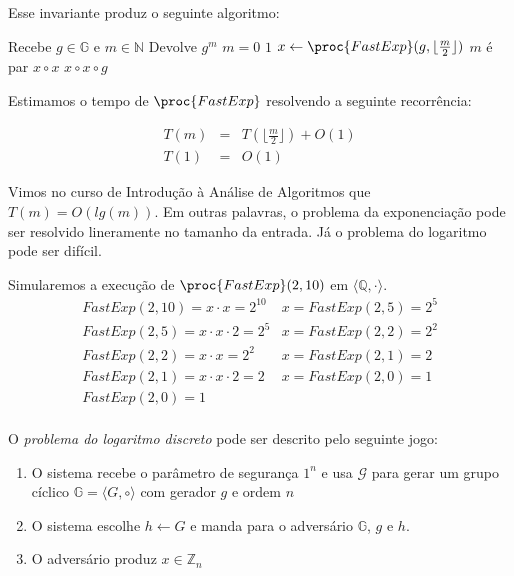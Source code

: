 Esse invariante produz o seguinte algoritmo:
\begin{codebox}
\li \Comment Recebe $g \in \mathbb{G}$ e $m \in \mathbb{N}$
\li \Comment Devolve $g^m$
\li \If $m = 0 $ 
\li \Then \Return $1$
\End
\li $x \gets \proc{FastExp}(g, \lfloor \frac{m}{2} \rfloor)$
\li \If $m$ é par
\li \Then \Return $x \circ x$
\li \Else \Return $x \circ x \circ g$
\End
\end{codebox}


Estimamos o tempo de $\proc{FastExp}$ resolvendo a seguinte recorrência:

\begin{eqnarray*}
  T(m) & = & T(\lfloor \frac{m}{2} \rfloor) + O(1)\\
  T(1) & = & O(1)
\end{eqnarray*}

Vimos no curso de Introdução à Análise de Algoritmos que $T(m) = O(lg(m))$.
Em outras palavras, o problema da exponenciação pode ser resolvido lineramente no tamanho da entrada.
Já o problema do logaritmo pode ser difícil.

\begin{example}
  Simularemos a execução de $\proc{FastExp}(2, 10)$ em $\langle \mathbb{Q}, \cdot \rangle$.
\begin{displaymath}
  \begin{array}{ll}
    FastExp(2, 10) = x \cdot x = 2^{10} & x = FastExp(2, 5) = 2^5 \\
    FastExp(2, 5)  = x \cdot x \cdot 2 = 2^5 & x = FastExp(2, 2) = 2^2\\
    FastExp(2, 2)  = x \cdot x = 2^2 & x = FastExp(2, 1) = 2\\
    FastExp(2, 1)  = x \cdot x \cdot 2 = 2 & x = FastExp(2, 0) = 1\\
    FastExp(2, 0)  = 1 \\
  \end{array}
\end{displaymath}
\end{example}

O {\em problema do logaritmo discreto} pode ser descrito pelo seguinte jogo:
\begin{enumerate}
\item O sistema recebe o parâmetro de segurança $1^n$ e usa $\mathcal{G}$ para gerar um grupo cíclico $\mathbb{G} = \langle G, \circ \rangle$ com gerador $g$ e ordem $n$
\item O sistema escolhe $h \leftarrow G$ e manda para o adversário $\mathbb{G}$, $g$ e $h$. 
\item O adversário produz $x \in \mathbb{Z}_n$
\end{enumerate}

